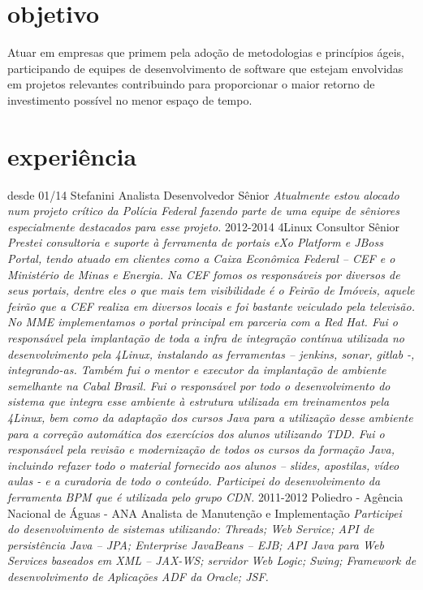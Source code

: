 \section{objetivo}

Atuar em empresas que primem pela adoção de metodologias e princípios ágeis, participando de equipes de desenvolvimento de software que estejam envolvidas em projetos relevantes contribuindo para proporcionar o maior retorno de investimento possível no menor espaço de tempo. 

\section{experiência}

\begin{entrylist}
  \entry
    {desde 01/14}
    {Stefanini}
    {Analista Desenvolvedor Sênior}
    {\emph{Atualmente estou alocado num projeto crítico da Polícia Federal fazendo parte de uma equipe de sêniores especialmente destacados para esse projeto.}}
  \entry
    {2012-2014}
    {4Linux}
    {Consultor Sênior}
    {\emph{Prestei consultoria e suporte à ferramenta de portais eXo Platform e JBoss Portal, tendo atuado em clientes como a Caixa Econômica Federal – CEF e o Ministério de Minas e Energia. Na CEF fomos os responsáveis por diversos de seus portais, dentre eles o que mais tem visibilidade é o Feirão de Imóveis, aquele feirão que a CEF realiza em diversos locais e foi bastante veiculado pela televisão. No MME implementamos o portal principal em parceria com a Red Hat.
Fui o responsável pela implantação de toda a infra de integração contínua utilizada no desenvolvimento pela 4Linux, instalando as ferramentas – jenkins, sonar, gitlab -, integrando-as.
Também fui o mentor e executor da implantação de ambiente semelhante na Cabal Brasil.
Fui o responsável por todo o desenvolvimento do sistema que integra esse ambiente à estrutura utilizada em treinamentos pela 4Linux, bem como da adaptação dos cursos Java para a utilização desse ambiente para a correção automática dos exercícios dos alunos utilizando TDD.
Fui o responsável pela revisão e modernização de todos os cursos da formação Java, incluindo refazer todo o material fornecido aos alunos – slides, apostilas, vídeo aulas - e a curadoria de todo o conteúdo.
Participei do desenvolvimento da ferramenta BPM que é utilizada pelo grupo CDN.}}
  \entry
    {2011-2012}
    {Poliedro - Agência Nacional de Águas - ANA}
    {Analista de Manutenção e Implementação}
    {\emph{Participei do desenvolvimento de sistemas utilizando: Threads; Web Service;  API de persistência Java – JPA; Enterprise JavaBeans – EJB; API Java para Web Services baseados em XML – JAX-WS; servidor Web Logic; Swing; Framework de desenvolvimento de Aplicações ADF da Oracle; JSF.}}

\end{entrylist}
